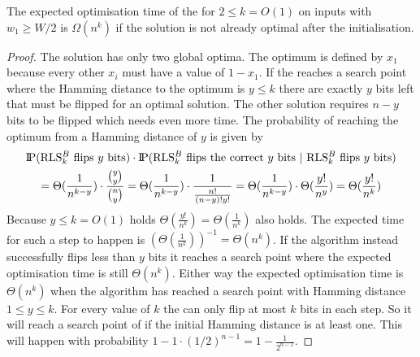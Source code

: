 \begin{lemma}
    The expected optimisation time of the \RLSN[k] for $2\le k=O(1)$ on inputs with $w_1\ge W/2$ is $\Omega(n^k)$ if the solution is not already optimal after the initialisation.
\end{lemma}
\begin{proof}
    The solution has only two global optima.
    The optimum is defined by $x_1$ because every other $x_i$ must have a value of $1-x_1$.
    If the \RLSN[k] reaches a search point where the Hamming distance to the optimum is $y\le k$ there are exactly $y$ bits left that must be flipped for an optimal solution.
    The other solution requires $n-y$ bits to be flipped which needs even more time.
    The probability of reaching the optimum from a Hamming distance of $y$ is given by
    \begin{gather}\nonumber
        \probP(\text{\RLSN[k] flips $y$ bits})\cdot\probP(\text{\RLSN[k] flips the correct $y$ bits | \RLSN[k] flips $y$ bits})\\ \nonumber
        =  \Theta(\frac{1}{n^{k-y}}) \cdot \frac{\binom{y}{y}}{\binom{n}{y}}
        =  \Theta(\frac{1}{n^{k-y}}) \cdot \frac{1}{\frac{n!}{(n-y)!y!}}
        =  \Theta(\frac{1}{n^{k-y}}) \cdot \Theta(\frac{y!}{n^y})
        =  \Theta(\frac{y!}{n^{k}})
    \end{gather}
    Because $y\le k = O(1)$ holds $\Theta(\frac{y!}{n^{k}})=\Theta(\frac{1}{n^{k}})$ also holds.
    The expected time for such a step to happen is ${(\Theta(\frac{1}{n^{k}}))}^{-1}=\Theta(n^{k})$.
    If the algorithm instead successfully flips less than $y$ bits it reaches a search point where the expected optimisation time is still $\Theta(n^{k})$.
    Either way the expected optimisation time is $\Theta(n^{k})$ when the algorithm has reached a search point with Hamming distance $1\le y\le k$.
    For every value of $k$ the \RLSN[k] can only flip at most $k$ bits in each step.
    So it will reach a search point of \RLSN[k] if the initial Hamming distance is at least one.
    This will happen with probability $1-1\cdot{(1/2)}^{n-1}=1-\frac{1}{2^{n-1}}$.
\end{proof}


